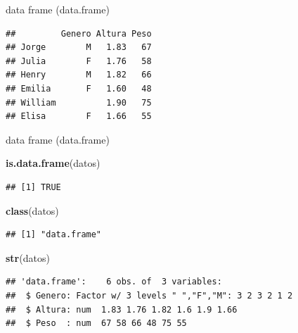 \documentclass[ignorenonframetext,]{beamer}
\newenvironment{Shaded}{\begin{snugshade}}{\end{snugshade}}
\newcommand{\KeywordTok}[1]{\textcolor[rgb]{0.13,0.29,0.53}{\textbf{#1}}}
\newcommand{\NormalTok}[1]{#1}
\begin{document}
\begin{frame}[fragile]{data frame (data.frame)}

\begin{verbatim}
##         Genero Altura Peso
## Jorge        M   1.83   67
## Julia        F   1.76   58
## Henry        M   1.82   66
## Emilia       F   1.60   48
## William          1.90   75
## Elisa        F   1.66   55
\end{verbatim}

\end{frame}

\begin{frame}[fragile]{data frame (data.frame)}

\begin{Shaded}
\begin{Highlighting}[]
\KeywordTok{is.data.frame}\NormalTok{(datos)}
\end{Highlighting}
\end{Shaded}

\begin{verbatim}
## [1] TRUE
\end{verbatim}

\begin{Shaded}
\begin{Highlighting}[]
\KeywordTok{class}\NormalTok{(datos)}
\end{Highlighting}
\end{Shaded}

\begin{verbatim}
## [1] "data.frame"
\end{verbatim}

\begin{Shaded}
\begin{Highlighting}[]
\KeywordTok{str}\NormalTok{(datos)}
\end{Highlighting}
\end{Shaded}

\begin{verbatim}
## 'data.frame':    6 obs. of  3 variables:
##  $ Genero: Factor w/ 3 levels " ","F","M": 3 2 3 2 1 2
##  $ Altura: num  1.83 1.76 1.82 1.6 1.9 1.66
##  $ Peso  : num  67 58 66 48 75 55
\end{verbatim}

\end{frame}
\end{document}
